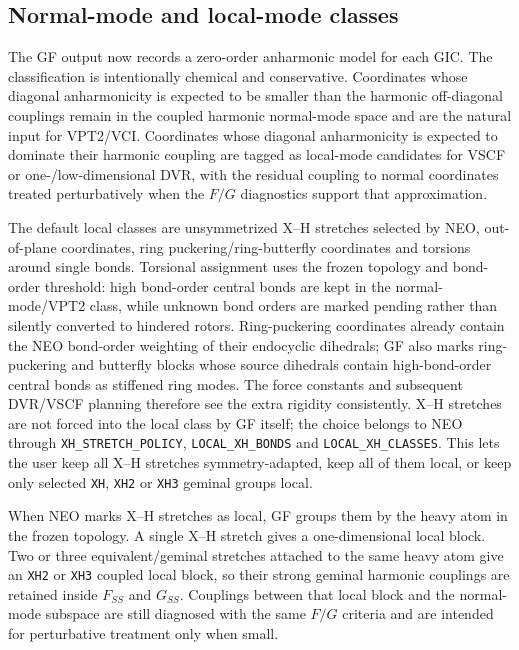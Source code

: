 \documentclass[11pt]{article}
\begin{document}
\subsection{Normal-mode and local-mode classes}

The GF output now records a zero-order anharmonic model for each GIC.  The
classification is intentionally chemical and conservative.  Coordinates whose
diagonal anharmonicity is expected to be smaller than the harmonic
off-diagonal couplings remain in the coupled harmonic normal-mode space and are
the natural input for VPT2/VCI.  Coordinates whose diagonal anharmonicity is
expected to dominate their harmonic coupling are tagged as local-mode
candidates for VSCF or one-/low-dimensional DVR, with the residual coupling to
normal coordinates treated perturbatively when the \(F/G\) diagnostics support
that approximation.

The default local classes are unsymmetrized X--H stretches selected by NEO,
out-of-plane coordinates, ring puckering/ring-butterfly coordinates and
torsions around single bonds.  Torsional assignment uses the frozen topology
and bond-order threshold: high bond-order central bonds are kept in the
normal-mode/VPT2 class, while unknown bond orders are marked pending rather
than silently converted to hindered rotors.  Ring-puckering coordinates already
contain the NEO bond-order weighting of their endocyclic dihedrals; GF also
marks ring-puckering and butterfly blocks whose source dihedrals contain
high-bond-order central bonds as stiffened ring modes.  The force constants and
subsequent DVR/VSCF planning therefore see the extra rigidity consistently.
X--H stretches are not forced into the local class by GF itself; the choice belongs to NEO through
\texttt{XH\_STRETCH\_POLICY}, \texttt{LOCAL\_XH\_BONDS} and
\texttt{LOCAL\_XH\_CLASSES}.  This lets the user keep all X--H stretches
symmetry-adapted, keep all of them local, or keep only selected \texttt{XH},
\texttt{XH2} or \texttt{XH3} geminal groups local.

When NEO marks X--H stretches as local, GF groups them by the heavy atom in the
frozen topology.  A single X--H stretch gives a one-dimensional local block.
Two or three equivalent/geminal stretches attached to the same heavy atom give
an \texttt{XH2} or \texttt{XH3} coupled local block, so their strong geminal
harmonic couplings are retained inside \(F_{SS}\) and \(G_{SS}\).  Couplings
between that local block and the normal-mode subspace are still diagnosed with
the same \(F/G\) criteria and are intended for perturbative treatment only when
small.
\end{document}
